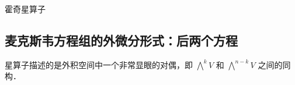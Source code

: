 

\begin{definition}{霍奇星算子}



\end{definition}






\subsection{麦克斯韦方程组的外微分形式：后两个方程\cite{KnotsVol4}}

星算子描述的是外积空间中一个非常显眼的对偶，即 $\bigwedge^k V$ 和 $\bigwedge^{n-k} V$ 之间的同构．




